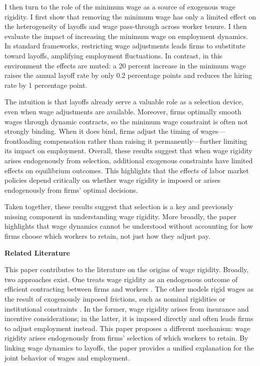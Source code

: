I then turn to the role of the minimum wage as a source of exogenous wage rigidity. I first show that removing the minimum wage has only a limited effect on the heterogeneity of layoffs and wage pass-through across worker tenure. I then evaluate the impact of increasing the minimum wage on employment dynamics. In standard frameworks, restricting wage adjustments leads firms to substitute toward layoffs, amplifying employment fluctuations. In contrast, in this environment the effects are muted: a 20 percent increase in the minimum wage raises the annual layoff rate by only 0.2 percentage points and reduces the hiring rate by 1 percentage point.

The intuition is that layoffs already serve a valuable role as a selection device, even when wage adjustments are available. Moreover, firms optimally smooth wages through dynamic contracts, so the minimum wage constraint is often not strongly binding. When it does bind, firms adjust the timing of wages—frontloading compensation rather than raising it permanently—further limiting its impact on employment. Overall, these results suggest that when wage rigidity arises endogenously from selection, additional exogenous constraints have limited effects on equilibrium outcomes. This highlights that the effects of labor market policies depend critically on whether wage rigidity is imposed or arises endogenously from firms’ optimal decisions.

Taken together, these results suggest that selection is a key and previously missing component in understanding wage rigidity. More broadly, the paper highlights that wage dynamics cannot be understood without accounting for how firms choose which workers to retain, not just how they adjust pay.

\textbf{Related Literature}

This paper contributes to the literature on the origins of wage rigidity. Broadly, two approaches exist. One treats wage rigidity as an endogenous outcome of efficient contracting between firms and workers \parencite{barro1977,thomas1988,balke2022,elsby2024}. The other models rigid wages as the result of exogenously imposed frictions, such as nominal rigidities or institutional constraints \parencite{christiano2005,nekarda2020,blanco2025}. In the former, wage rigidity arises from insurance and incentive considerations; in the latter, it is imposed directly and often leads firms to adjust employment instead. This paper proposes a different mechanism: wage rigidity arises endogenously from firms’ selection of which workers to retain. By linking wage dynamics to layoffs, the paper provides a unified explanation for the joint behavior of wages and employment.

